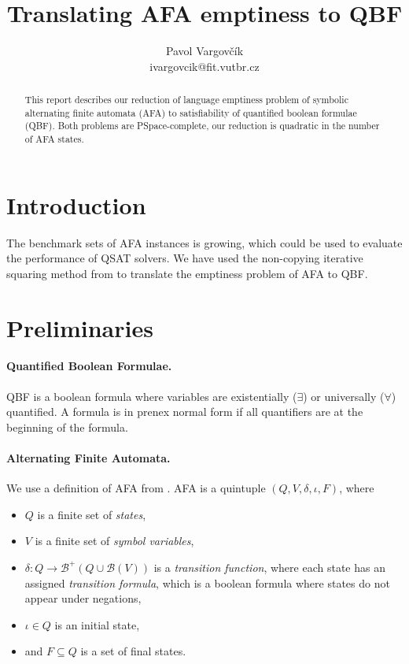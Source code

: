 \documentclass{article}
\title{Translating AFA emptiness to QBF}
\author{Pavol Vargovčík \\ ivargovcik@fit.vutbr.cz}
\date{}
\begin{document}
\maketitle

\begin{abstract}
This report describes our reduction of language emptiness problem of symbolic alternating finite automata (AFA) to satisfiability of quantified boolean formulae (QBF).
Both problems are PSpace-complete, our reduction is quadratic in the number of AFA states.
\end{abstract}

\section{Introduction}

The benchmark sets of AFA instances is growing, which could be used to evaluate the performance of QSAT solvers.
We have used the non-copying iterative squaring method from \cite{bmc2qbf, rintanen2001partial, biere2004resolve} to translate the emptiness problem of AFA to QBF.

\section{Preliminaries}

\paragraph{Quantified Boolean Formulae.}
QBF is a boolean formula where variables are existentially ($\exists$) or universally ($\forall$) quantified. A formula is in prenex normal form if all quantifiers are at the beginning of the formula.

\paragraph{Alternating Finite Automata.}
We use a definition of AFA from \cite{antisat}. AFA is a quintuple $(Q, V, \delta, \iota, F)$, where
\begin{itemize}
  \item $Q$ is a finite set of \emph{states},
  \item $V$ is a finite set of \emph{symbol variables},
  \item $\delta: Q \rightarrow \mathcal{B}^+(Q \cup \mathcal{B}(V))$ is a \emph{transition function}, where each state has an assigned \emph{transition formula}, which is a boolean formula where states do not appear under negations,
  \item $\iota \in Q$ is an initial state,
  \item and $F \subseteq Q$ is a set of final states.
\end{itemize}
\end{document}

